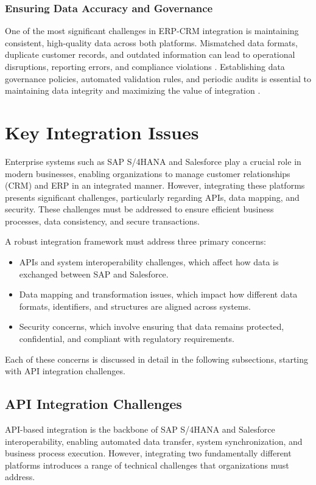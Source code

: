\subsubsection{Ensuring Data Accuracy and Governance}
One of the most significant challenges in ERP-CRM integration is maintaining consistent, high-quality data across both platforms. Mismatched data formats, duplicate customer records, and outdated information can lead to operational disruptions, reporting errors, and compliance violations \cite{gebreyes2018}. Establishing data governance policies, automated validation rules, and periodic audits is essential to maintaining data integrity and maximizing the value of integration \cite{shaul2013}.

\section{Key Integration Issues}

Enterprise systems such as SAP S/4HANA and Salesforce play a crucial role in modern businesses, enabling organizations to manage customer relationships (CRM) and ERP in an integrated manner. However, integrating these platforms presents significant challenges, particularly regarding APIs, data mapping, and security. These challenges must be addressed to ensure efficient business processes, data consistency, and secure transactions.

A robust integration framework must address three primary concerns:
\begin{itemize}
    \item APIs and system interoperability challenges, which affect how data is exchanged between SAP and Salesforce.
    \item Data mapping and transformation issues, which impact how different data formats, identifiers, and structures are aligned across systems.
    \item Security concerns, which involve ensuring that data remains protected, confidential, and compliant with regulatory requirements.
\end{itemize}

Each of these concerns is discussed in detail in the following subsections, starting with API integration challenges.

\subsection{API Integration Challenges}
API-based integration is the backbone of SAP S/4HANA and Salesforce interoperability, enabling automated data transfer, system synchronization, and business process execution. However, integrating two fundamentally different platforms introduces a range of technical challenges that organizations must address.

